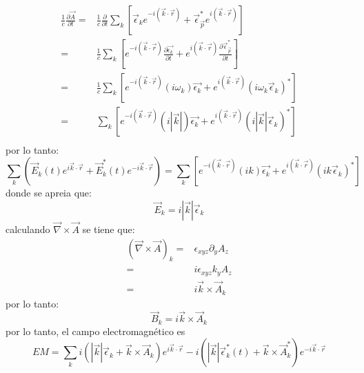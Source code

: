\begin{align*}
    \frac{1}{c}\frac{\partial \vec{A}}{\partial t} =&\frac{1}{c}\frac{\partial}{\partial t}\sum_k\left[\vec{\epsilon}_k e^{-i\left(\vec{k}\cdot \vec{r}\right)}+\vec{\epsilon}_{\vec{p}}^* e^{i\left(\vec{k}\cdot \vec{r}\right)}\right]\\
    =& \frac{1}{c}\sum_k\left[ e^{-i\left(\vec{k}\cdot \vec{r}\right)}\frac{\partial \vec{\epsilon_k}}{\partial t}+ e^{i\left(\vec{k}\cdot \vec{r}\right) }\frac{\partial \vec{\epsilon}_{\vec{p}}^*}{\partial t}\right]\\
    =& \frac{1}{c}\sum_k\left[ e^{-i\left(\vec{k}\cdot \vec{r}\right)}(i\omega_k)\vec{\epsilon_k}+ e^{i\left(\vec{k}\cdot \vec{r}\right) }(i\omega_k \vec{\epsilon}_k)^*\right]\\
    =&\sum_k\left[ e^{-i\left(\vec{k}\cdot \vec{r}\right)}(i|\vec{k}|)\vec{\epsilon_k}+ e^{i\left(\vec{k}\cdot \vec{r}\right) }(i|\vec{k}| \vec{\epsilon}_k)^*\right]\\
\end{align*}
por lo tanto:
\begin{equation*}
    \sum_k \left(\vec{E}_k(t)e^{i\vec{k}\cdot \vec{r}}+\vec{E}_k^*(t)e^{-i\vec{k}\cdot \vec{r}}\right)=\sum_k\left[ e^{-i\left(\vec{k}\cdot \vec{r}\right)}(ik)\vec{\epsilon_k}+ e^{i\left(\vec{k}\cdot \vec{r}\right) }(ik \vec{\epsilon}_k)^*\right]
\end{equation*}
donde se apreia que:
\begin{equation*}
    \vec{E}_k = i|\vec{k}|\vec{\epsilon}_k
\end{equation*}
calculando $\vec{\nabla}\times \vec{A}$ se tiene que:
\begin{align*}
    \left(\vec{\nabla}\times\vec{A}\right)_k =&\epsilon_{xyz} \partial_y A_z\\
    =& i \epsilon_{xyz} k_y A_z \\
    =& i\vec{k}\times\vec{A}_k
\end{align*}
por lo tanto:
\begin{equation*}
    \vec{B}_k=i\vec{k}\times\vec{A}_k
\end{equation*}
por lo tanto, el campo electromagnético es
\begin{equation*}
    EM=\sum_k i\left(|\vec{k}|\vec{\epsilon}_k+\vec{k}\times\vec{A}_k\right) e^{i\vec{k}\cdot \vec{r}}-i\left(|\vec{k}|\vec{\epsilon}_k^*(t)+\vec{k}\times\vec{A}_k^*\right)e^{-i\vec{k}\cdot \vec{r}}
\end{equation*}